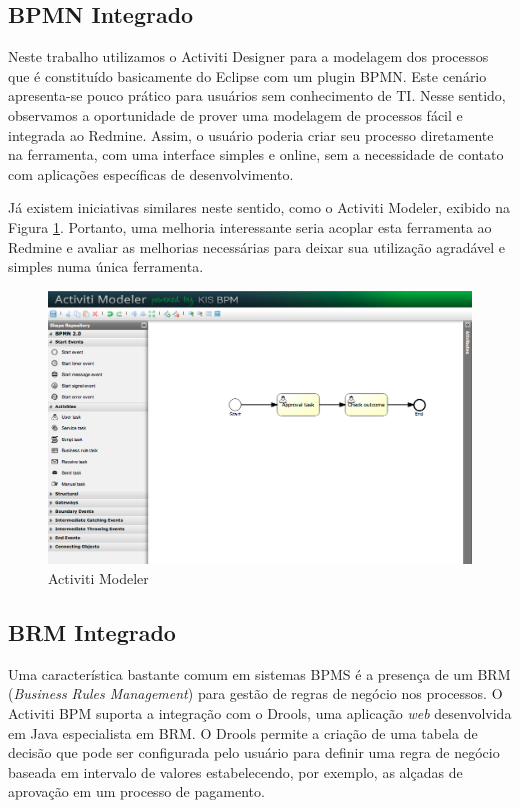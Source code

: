 \subsection{BPMN Integrado}

Neste trabalho utilizamos o Activiti Designer para a modelagem dos processos que é constituído basicamente do Eclipse com um plugin BPMN. Este cenário apresenta-se pouco prático para usuários sem conhecimento de TI. Nesse sentido, observamos a oportunidade de prover uma modelagem de processos fácil e integrada ao Redmine. Assim, o usuário poderia criar seu processo diretamente na ferramenta, com uma interface simples e online, sem a necessidade de contato com aplicações específicas de desenvolvimento.

Já existem iniciativas similares neste sentido, como o Activiti Modeler\cite{activiti_modeler}, exibido na Figura \ref{fig:activiti_modeler}. Portanto, uma melhoria interessante seria acoplar esta ferramenta ao Redmine e avaliar as melhorias necessárias para deixar sua utilização agradável e simples numa única ferramenta.

\begin{figure}[H]
\centering
\includegraphics[width=1\textwidth]{imagens/activiti_modeler.png}
\caption{Activiti Modeler}
\label{fig:activiti_modeler}
\end{figure}

\subsection{BRM Integrado}

Uma característica bastante comum em sistemas BPMS é a presença de um BRM (\textit{Business Rules Management}) para gestão de regras de negócio nos processos. O Activiti BPM suporta a integração com o Drools, uma aplicação \textit{web} desenvolvida em Java especialista em BRM. O Drools permite a criação de uma tabela de decisão que pode ser configurada pelo usuário para definir uma regra de negócio baseada em intervalo de valores estabelecendo, por exemplo, as alçadas de aprovação em um processo de pagamento.

